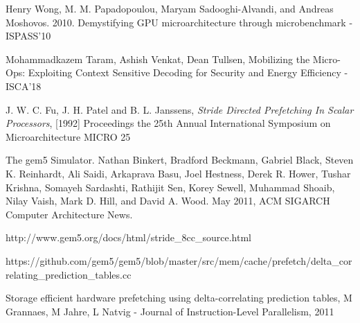 \documentclass[10pt]{beamer}
\begin{document}
\begin{frame}[allowframebreaks]
\begin{thebibliography}{10}
Henry Wong, M. M. Papadopoulou, Maryam Sadooghi-Alvandi, and Andreas Moshovos. 2010. Demystifying GPU microarchitecture through microbenchmark - ISPASS'10

Mohammadkazem Taram, Ashish Venkat, Dean Tullsen, Mobilizing the Micro-Ops: Exploiting Context Sensitive Decoding for Security and Energy Efficiency - ISCA'18

J. W. C. Fu, J. H. Patel and B. L. Janssens, {\it Stride Directed Prefetching In Scalar Processors}, [1992] Proceedings the 25th Annual International Symposium on Microarchitecture MICRO 25

The gem5 Simulator. Nathan Binkert, Bradford Beckmann, Gabriel Black, Steven K. Reinhardt, Ali Saidi, Arkaprava Basu, Joel Hestness, Derek R. Hower, Tushar Krishna, Somayeh Sardashti, Rathijit Sen, Korey Sewell, Muhammad Shoaib, Nilay Vaish, Mark D. Hill, and David A. Wood. May 2011, ACM SIGARCH Computer Architecture News.

http://www.gem5.org/docs/html/stride\_8cc\_source.html

https://github.com/gem5/gem5/blob/master/src/mem/cache/prefetch/delta\_correlating\_prediction\_tables.cc

Storage efficient hardware prefetching using delta-correlating prediction tables, M Grannaes, M Jahre, L Natvig - Journal of Instruction-Level Parallelism, 2011
\end{thebibliography}
\end{frame}

\end{document}

